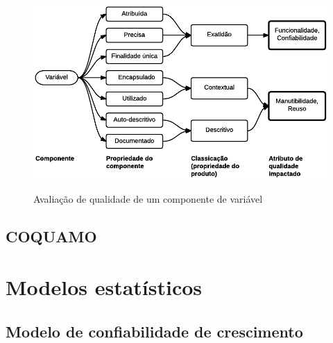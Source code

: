 \documentclass[
	12pt,				%
	openright,			%
	oneside,			%
	a4paper,			%
	english,			%
	brazil,				%
	]{abntex2}
\begin{document}
\begin{figure}[H]
    \centering
    \caption{Avaliação de qualidade de um componente de variável}
    \graphicspath{ {./graphics/} }
    \includegraphics[scale=0.85]{dromey-estrutura_modelo_exemplo-andrei}
    \label{fig:dromey-estrutura_modelo_exemplo}
\end{figure}

\subsection{COQUAMO}

\section{Modelos estatísticos}
\subsection{Modelo de confiabilidade de crescimento}
\end{document}
